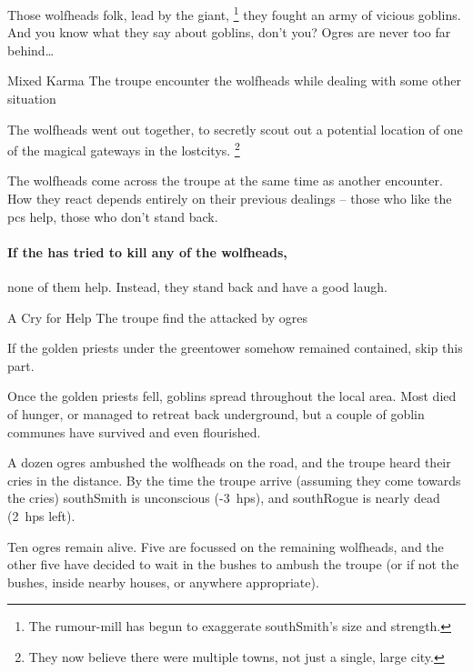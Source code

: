 \begin{speechtext}
  Those \glspl{wolfhead} folk, lead by the giant,%
  \footnote{The rumour-mill has begun to exaggerate \gls{southSmith}'s size and strength.}
  they fought an army of vicious goblins.
  And you know what they say about goblins, don't you?
  Ogres are never too far behind\ldots
\end{speechtext}


{\squash Mixed Karma}%
{The troupe encounter the \glspl{wolfhead} while dealing with some other situation}%

\begin{exampletext}
  The \glspl{wolfhead} went out together, to secretly scout out a potential location of one of the magical gateways in the \glspl{lostcity}.%
  \footnote{They now believe there were multiple towns, not just a single, large city.}
\end{exampletext}

The \glspl{wolfhead} come across the troupe at the same time as another encounter.
How they react depends entirely on their previous dealings -- those who like the \glspl{pc} help, those who don't stand back.

\paragraph{If the  has tried to kill any of the \glspl{wolfhead},}
none of them help.
Instead, they stand back and have a good laugh.

{A Cry for Help}%
{The troupe find the  attacked by ogres}%

If the golden priests under the \gls{greentower} somehow remained contained, skip this part.

\begin{exampletext}
  Once the golden priests fell, goblins spread throughout the local area.
  Most died of hunger, or managed to retreat back underground, but a couple of goblin communes have survived and even flourished.
\end{exampletext}

A dozen ogres ambushed the \glspl{wolfhead} on the road, and the troupe heard their cries in the distance.
By the time the troupe arrive (assuming they come towards the cries) \gls{southSmith} is unconscious (-3~\glspl{hp}), and \gls{southRogue} is nearly dead (2~\glspl{hp} left).

Ten ogres remain alive.
Five are focussed on the remaining \glspl{wolfhead}, and the other five have decided to wait in the bushes to ambush the troupe (or if not the bushes, inside nearby houses, or anywhere appropriate).



